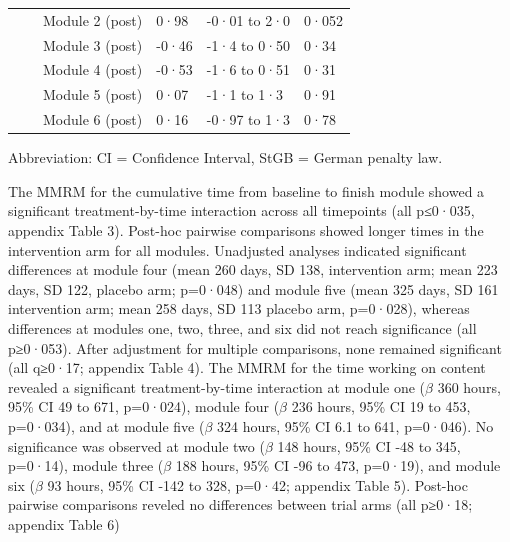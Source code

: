 \documentclass[
  super,
  preprint,
  1p,
  onecolumn]{elsarticle}
\begin{document}
\begin{table}
{\begin{tabular*}{\linewidth}{@{\extracolsep{\fill}}llll}
    Module 2 (post) & 0·98 & -0·01 to 2·0 & 0·052 \\ 
    Module 3 (post) & -0·46 & -1·4 to 0·50 & 0·34 \\ 
    Module 4 (post) & -0·53 & -1·6 to 0·51 & 0·31 \\ 
    Module 5 (post) & 0·07 & -1·1 to 1·3 & 0·91 \\ 
    Module 6 (post) & 0·16 & -0·97 to 1·3 & 0·78 \\ 
\bottomrule
\end{tabular*}
\begin{minipage}{\linewidth}
\vspace{.05em}
\parbox{\linewidth}{\raggedright {Abbreviation: CI = Confidence Interval, StGB = German penalty law.\\
}}\end{minipage}

}

\end{table}%

\newpage{}

The MMRM for the cumulative time from baseline to finish module showed a
significant treatment-by-time interaction across all timepoints (all
p≤0·035, appendix Table 3). Post-hoc pairwise comparisons showed longer
times in the intervention arm for all modules. Unadjusted analyses
indicated significant differences at module four (mean 260 days, SD 138,
intervention arm; mean 223 days, SD 122, placebo arm; p=0·048) and
module five (mean 325 days, SD 161 intervention arm; mean 258 days, SD
113 placebo arm, p=0·028), whereas differences at modules one, two,
three, and six did not reach significance (all p≥0·053). After
adjustment for multiple comparisons, none remained significant (all
q≥0·17; appendix Table 4). The MMRM for the time working on content
revealed a significant treatment-by-time interaction at module one
(\(\beta\) 360 hours, 95\% CI 49 to 671, p=0·024), module four
(\(\beta\) 236 hours, 95\% CI 19 to 453, p=0·034), and at module five
(\(\beta\) 324 hours, 95\% CI 6.1 to 641, p=0·046). No significance was
observed at module two (\(\beta\) 148 hours, 95\% CI -48 to 345,
p=0·14), module three (\(\beta\) 188 hours, 95\% CI -96 to 473, p=0·19),
and module six (\(\beta\) 93 hours, 95\% CI -142 to 328, p=0·42;
appendix Table 5). Post-hoc pairwise comparisons reveled no differences
between trial arms (all p≥0·18; appendix Table 6)

\newpage{}
\end{document}
